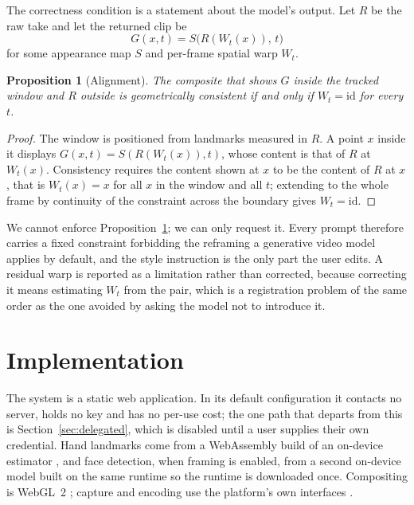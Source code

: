 \documentclass{article}
\newtheorem{proposition}{Proposition}
\theoremstyle{definition}
\begin{document}
The correctness condition is a statement about the model's output. Let $R$ be the
raw take and let the returned clip be
\begin{equation}
  \label{eq:warp}
  G(x,t) = S\big(R(W_t(x)),\,t\big)
\end{equation}
for some appearance map $S$ and per-frame spatial warp $W_t$.

\begin{proposition}[Alignment]
\label{prop:alignment}
The composite that shows $G$ inside the tracked window and $R$ outside is
geometrically consistent if and only if $W_t = \mathrm{id}$ for every $t$.
\end{proposition}

\begin{proof}
The window is positioned from landmarks measured in $R$. A point $x$ inside it
displays $G(x,t) = S(R(W_t(x)),t)$, whose content is that of $R$ at $W_t(x)$.
Consistency requires the content shown at $x$ to be the content of $R$ at $x$,
that is $W_t(x) = x$ for all $x$ in the window and all $t$; extending to the
whole frame by continuity of the constraint across the boundary gives
$W_t=\mathrm{id}$.
\end{proof}

We cannot enforce Proposition~\ref{prop:alignment}; we can only request it. Every
prompt therefore carries a fixed constraint forbidding the reframing a generative
video model applies by default, and the style instruction is the only part the
user edits. A residual warp is reported as a limitation rather than corrected,
because correcting it means estimating $W_t$ from the pair, which is a
registration problem of the same order as the one avoided by asking the model not
to introduce it.

\section{Implementation}
\label{sec:implementation}

The system is a static web application. In its default configuration it
contacts no server, holds no key and has no per-use cost; the one path that
departs from this is Section~\ref{sec:delegated}, which is disabled until a user
supplies their own credential. Hand landmarks come from a WebAssembly build of an
on-device estimator \citep{zhang2020mediapipehands}, and face detection, when
framing is enabled, from a second on-device model \citep{bazarevsky2019blazeface}
built on the same runtime so the runtime is downloaded once. Compositing is
WebGL~2 \citep{khronos2022webgl2}; capture and encoding use the platform's own
interfaces \citep{w3c2025mediacapture, w3c2025mediarecording}.
\end{document}
